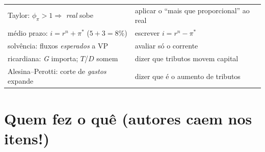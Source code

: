 \documentclass[12pt, a4paper]{article}
\begin{document}
\begin{resultbox}[title={Conceito certo $\times$ troca falsa}]
\begin{tabular}{p{6.6cm} p{6.9cm}}
Taylor: $\phi_\pi > 1 \Rightarrow$ \emph{real} sobe &
aplicar o ``mais que proporcional'' ao real \\
médio prazo: $i = r^n + \pi^*$ ($5{+}3{=}8\%$) &
escrever $i = r^n - \pi^*$ \\
solvência: fluxos \emph{esperados} a VP &
avaliar só o corrente \\
ricardiana: \emph{G} importa; $T$/$D$ somem &
dizer que tributos movem capital \\
Alesina--Perotti: corte de \emph{gastos} expande &
dizer que é o aumento de tributos \\
\bottomrule
\end{tabular}
\end{resultbox}

\section{Quem fez o quê (autores caem nos itens!)}
\end{document}
